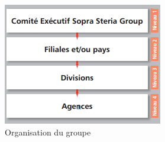 \begin{figure}[h]
	\includegraphics[scale=0.8]{images/sopraSteriaOrganisation.png}
	\centering
	\caption{Organisation du groupe}
	\label{sopraSteriaOrganisation}
\end{figure}
		